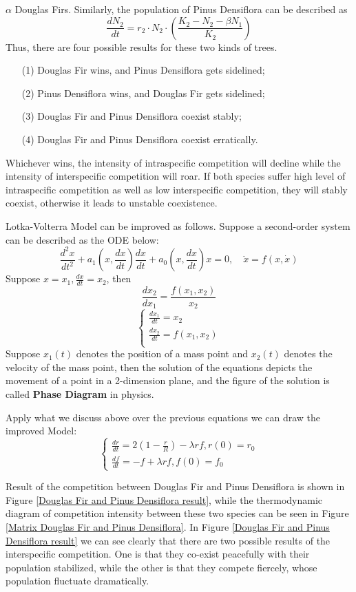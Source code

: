 \documentclass{mcmthesis}
\numberwithin{figure}{section}
\numberwithin{table}{section}
\numberwithin{equation}{section}
\begin{document}
 $ \alpha $ Douglas Firs.
 Similarly, the population of Pinus Densiflora can be described as $$
 \frac{dN_2}{dt} = r_2\cdot N_2\cdot (\frac{K_2-N_2-\beta N_1}{K_2})
 $$ 
Thus, there are four possible results for these two kinds of trees.
\begin{enumerate}
  \item [(1)] Douglas Fir wins, and Pinus Densiflora gets sidelined;
  \item [(2)] Pinus Densiflora wins, and Douglas Fir gets sidelined;
  \item [(3)] Douglas Fir and Pinus Densiflora coexist stably;
  \item [(4)] Douglas Fir and Pinus Densiflora coexist erratically.
\end{enumerate}

Whichever wins, the intensity of intraspecific competition will decline while the
intensity of interspecific competition will roar. If both species suffer high level of
intraspecific competition as well as low interspecific competition, they will stably
coexist, otherwise it leads to unstable coexistence. 
\par
Lotka-Volterra Model can be improved as follows. Suppose a second-order system can be described as the ODE below:
$$
  \frac{d^2x}{dt^2}+a_1(x,\frac{dx}{dt})\frac{dx}{dt} + a_0(x,\frac{dx}{dt})x = 0, \quad \ddot{x} = f(x,\dot{x})
$$  
Suppose $ x = x_1, \frac{dx}{dt} = x_2 $, then
$$
  \frac{dx_2}{dx_1} = \frac{f(x_1,x_2)}{x_2}
$$ 
$$
\begin{cases}
        \frac{dx_1}{dt} = x_2\\
      \frac{dx_2}{dt} =f(x_1,x_2)\\
\end{cases}
$$ 
Suppose $ x_1(t) $ denotes the position of a mass point and $ x_2(t) $ denotes the velocity of the mass point, then the 
solution of the equations depicts the movement of a point in a 2-dimension plane, and the figure of the solution is called
\textbf{Phase Diagram} in physics.
\par
Apply what we discuss above over the previous equations we can draw the improved Model:
$$
  \begin{cases}
    \frac{dr}{dt} = 2(1-\frac{r}{R})-\lambda rf, r(0) = r_0\\
    \frac{df}{dt} = -f + \lambda rf, f(0) = f_0
  \end{cases}
$$ 
\par
Result of the competition between Douglas Fir and Pinus Densiflora is shown in 
Figure \ref{Douglas Fir and Pinus Densiflora result}, while the thermodynamic diagram
of competition intensity between these two species can be seen in Figure \ref{Matrix Douglas Fir and Pinus Densiflora}.
In Figure \ref{Douglas Fir and Pinus Densiflora result} we can see clearly that 
there are two possible results of the interspecific competition. One is that they co-exist peacefully with their
population stabilized, while the other is that they compete fiercely, whose population fluctuate
dramatically.
\end{document}
